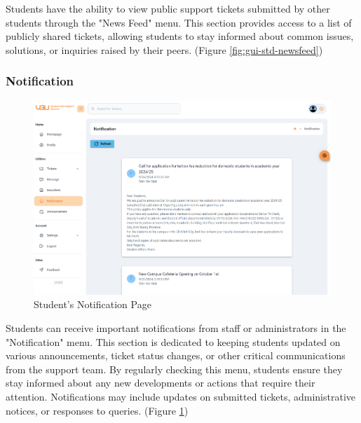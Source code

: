 	Students have the ability to view public support tickets submitted by other students through the "News Feed" menu. This section provides access to a list of publicly shared tickets, allowing students to stay informed about common issues, solutions, or inquiries raised by their peers. (Figure \ref{fig:gui-std-newsfeed})
	
	
	
	\subsubsection{Notification}

	\begin{figure}[H]
		\centering
		\includegraphics[width=1.0\linewidth]{graphics/gui/student/noti}
		\caption{Student's Notification Page}
		\label{fig:gui-std-noti}
	\end{figure}
		Students can receive important notifications from staff or administrators in the "Notification" menu. This section is dedicated to keeping students updated on various announcements, ticket status changes, or other critical communications from the support team. By regularly checking this menu, students ensure they stay informed about any new developments or actions that require their attention. Notifications may include updates on submitted tickets, administrative notices, or responses to queries. (Figure \ref{fig:gui-std-noti})
	
	
	
